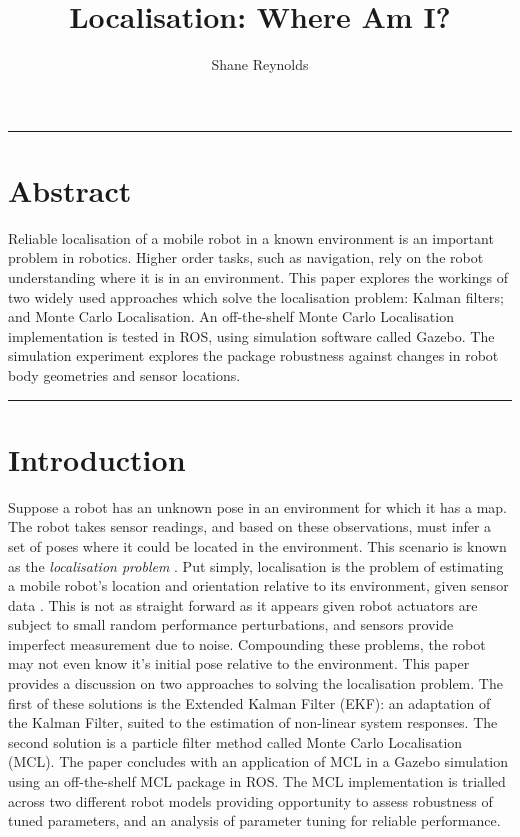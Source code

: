 \documentclass[a4paper]{article}
\begin{document}
\title{Localisation: Where Am I?}
\author{Shane Reynolds}
\maketitle

\rule{\textwidth}{1pt}
\section*{Abstract}
Reliable localisation of a mobile robot in a known environment is an important problem in robotics. Higher order tasks, such as navigation, rely on the robot understanding where it is in an environment. This paper explores the workings of two widely used approaches which solve the localisation problem: Kalman filters; and Monte Carlo Localisation. An off-the-shelf Monte Carlo Localisation implementation is tested in ROS, using simulation software called Gazebo. The simulation experiment explores the package robustness against changes in robot body geometries and sensor locations.\\

\rule{\textwidth}{1pt}

\section{Introduction}
Suppose a robot has an unknown pose in an environment for which it has a map. The robot takes sensor readings, and based on these observations, must infer a set of poses where it could be located in the environment. This scenario is known as the \textit{localisation problem} \cite{Cox:1991, Wang:1988}. Put simply, localisation is the problem of estimating a mobile robot's location and orientation relative to its environment, given sensor data \cite{Thrun:2001}. This is not as straight forward as it appears given robot actuators are subject to small random performance perturbations, and sensors provide imperfect measurement due to noise. Compounding these problems, the robot may not even know it's initial pose relative to the environment. This paper provides a discussion on two approaches to solving the localisation problem. The first of these solutions is the Extended Kalman Filter (EKF): an adaptation of the Kalman Filter, suited to the estimation of non-linear system responses. The second solution is a particle filter method called Monte Carlo Localisation (MCL). The paper concludes with an application of MCL in a Gazebo simulation using an off-the-shelf MCL package in ROS. The MCL implementation is trialled across two different robot models providing opportunity to assess robustness of tuned parameters, and an analysis of parameter tuning for reliable performance.
\end{document}

